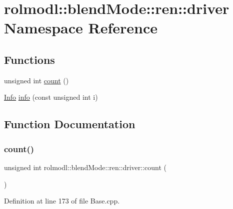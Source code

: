\hypertarget{namespacerolmodl_1_1blend_mode_1_1ren_1_1driver}{}\section{rolmodl\+::blend\+Mode\+::ren\+::driver Namespace Reference}
\label{namespacerolmodl_1_1blend_mode_1_1ren_1_1driver}
\subsection*{Functions}
\begin{DoxyCompactItemize}
\item 
unsigned int \mbox{\hyperlink{namespacerolmodl_1_1blend_mode_1_1ren_1_1driver_a876e0464f4dcc864e44d74519ce641fd}{count}} ()
\item 
\mbox{\hyperlink{structrolmodl_1_1blend_mode_1_1ren_1_1_info}{Info}} \mbox{\hyperlink{namespacerolmodl_1_1blend_mode_1_1ren_1_1driver_a0e09f0313c7480405e7da8e2806a48f2}{info}} (const unsigned int i)
\end{DoxyCompactItemize}


\subsection{Function Documentation}
\mbox{\label{namespacerolmodl_1_1blend_mode_1_1ren_1_1driver_a876e0464f4dcc864e44d74519ce641fd}} 
\subsubsection{\texorpdfstring{count()}{count()}}
{\footnotesize\ttfamily unsigned int rolmodl\+::blend\+Mode\+::ren\+::driver\+::count (\begin{DoxyParamCaption}{ }\end{DoxyParamCaption})}



Definition at line 173 of file Base.\+cpp.

\mbox{\label{namespacerolmodl_1_1blend_mode_1_1ren_1_1driver_a0e09f0313c7480405e7da8e2806a48f2}} 
